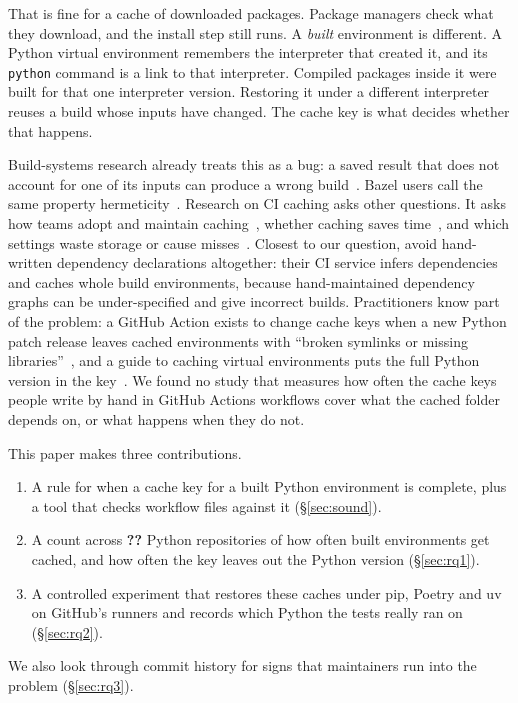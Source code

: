 \documentclass[10pt,a4paper]{article}
\newcommand{\ck}[1]{\textbf{??}}\newcommand{\repourl}{\url{https://github.com/mark124/cache-key-soundness}}%
\begin{document}
That is fine for a cache of downloaded packages. Package managers check what
they download, and the install step still runs. A \emph{built} environment is
different. A Python virtual environment remembers the interpreter that created
it, and its \texttt{python} command is a link to that interpreter. Compiled
packages inside it were built for that one interpreter version. Restoring it
under a different interpreter reuses a build whose inputs have changed. The cache key is what decides whether that happens.

Build-systems research already treats this as a bug: a saved result that
does not account for one of its inputs can produce a wrong
build~\cite{mokhov2018build,licker2019incorrect}. Bazel users call the same
property hermeticity~\cite{zheng2025hermeticity}. Research on CI caching asks
other questions. It asks how teams adopt and maintain
caching~\cite{hasan2026caching}, whether caching saves
time~\cite{ghaleb2026travis,bouzenia2024resource}, and which settings waste
storage or cause misses~\cite{urdih2026smells,khatami2024smells}. Closest to
our question, \citet{gallaba2022kotinos} avoid hand-written dependency
declarations altogether: their CI service infers dependencies and caches whole
build environments, because hand-maintained dependency graphs can be
under-specified and give incorrect builds. Practitioners know part of the
problem: a GitHub Action exists to change cache keys when a new Python patch
release leaves cached environments with ``broken symlinks or missing
libraries''~\cite{mckee2024detectpythons}, and a guide to caching virtual
environments puts the full Python version in the key~\cite{johnson2023venvcache}.
We found no study that measures how often the cache keys people write by hand
in GitHub Actions workflows cover what the cached folder depends on, or what
happens when they do not.

This paper makes three contributions.
\begin{enumerate}
\item A rule for when a cache key for a built Python environment is complete,
  plus a tool that checks workflow files against it (\S\ref{sec:sound}).
\item A count across \ck{h.repos_sampled} Python repositories of how often
  built environments get cached, and how often the key leaves out the Python
  version (\S\ref{sec:rq1}).
\item A controlled experiment that restores these caches under pip, Poetry and
  uv on GitHub's runners and records which Python the tests really ran on
  (\S\ref{sec:rq2}).
\end{enumerate}
We also look through commit history for signs that maintainers run into the
problem (\S\ref{sec:rq3}).
\end{document}
